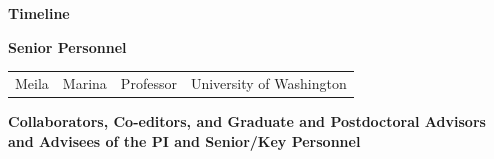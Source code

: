 \documentclass[floatfix,11pt]{revtex4-1}
\begin{document}
{\bf Timeline} 

\vspace{-2.1em}



\vspace{0.6em}


\vspace{0.6em}

\newpage
\centerline{\textbf{Senior Personnel}}
\begin{tabular}{llll}
Meila & Marina & Professor & University of Washington\\
\end{tabular}

\centerline{\textbf{Collaborators, Co-editors, and Graduate and Postdoctoral Advisors and Advisees of the PI and Senior/Key Personnel}}
\begin{tabular}{llll}

\end{tabular}
\end{document}
